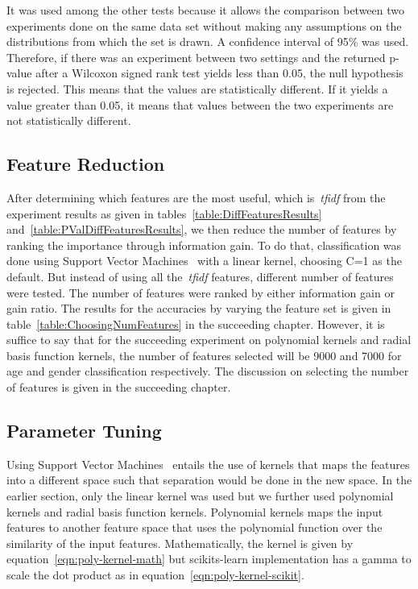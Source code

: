 \documentclass[a4paper]{llncs}
\begin{document}
It was used among the other tests because it allows the comparison between two experiments done on the same data set without making any assumptions on the distributions from which the set is drawn. A confidence interval of 95\% was used. Therefore, if there was an experiment between two settings and the returned p-value after a Wilcoxon signed rank test yields less than 0.05, the null hypothesis is rejected. This means that the values are statistically different. If it yields a value greater than 0.05, it means that values between the two experiments are not statistically different.



\subsection{Feature Reduction}
After determining which features are the most useful, which is~\textit{tfidf} from the experiment results as given in tables~\ref{table:DiffFeaturesResults} and~\ref{table:PValDiffFeaturesResults}, we then reduce the number of features by ranking the importance through information gain. To do that, classification was done using Support Vector Machines~\cite{cortes1995support} with a linear kernel, choosing C=1 as the default. But instead of using all the~\textit{tfidf} features, different number of features were tested. The number of features were ranked by either information gain or gain ratio. The results for the accuracies by varying the feature set is given in table~\ref{table:ChoosingNumFeatures} in the succeeding chapter. However, it is suffice to say that for the succeeding experiment on polynomial kernels and radial basis function kernels, the number of features selected will be 9000 and 7000 for age and gender classification respectively. The discussion on selecting the number of features is given in the succeeding chapter. 




\subsection{Parameter Tuning}
Using Support Vector Machines~\cite{cortes1995support} entails the use of kernels that maps the features into a different space such that separation would be done in the new space. In the earlier section, only the linear kernel was used but we further used polynomial kernels and radial basis function kernels. Polynomial kernels maps the input features to another feature space that uses the polynomial function over the similarity of the input features. Mathematically, the kernel is given by equation~\ref{eqn:poly-kernel-math} but scikits-learn implementation has a gamma to scale the dot product as in equation~\ref{eqn:poly-kernel-scikit}.
\end{document}
